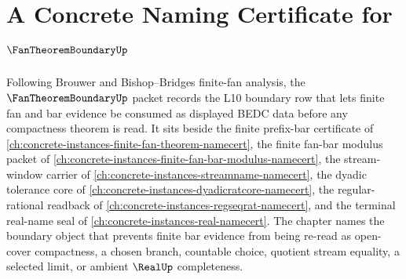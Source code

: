\chapter{A Concrete Naming Certificate for $\FanTheoremBoundaryUp$}
\label{ch:concrete-instances-fan-theorem-boundary-namecert}

Following Brouwer and Bishop--Bridges finite-fan analysis, the $\FanTheoremBoundaryUp$ packet records the L10 boundary row that lets finite fan and bar evidence be consumed as displayed BEDC data before any compactness theorem is read. It sits beside the finite prefix-bar certificate of \autoref{ch:concrete-instances-finite-fan-theorem-namecert}, the finite fan-bar modulus packet of \autoref{ch:concrete-instances-finite-fan-bar-modulus-namecert}, the stream-window carrier of \autoref{ch:concrete-instances-streamname-namecert}, the dyadic tolerance core of \autoref{ch:concrete-instances-dyadicratcore-namecert}, the regular-rational readback of \autoref{ch:concrete-instances-regseqrat-namecert}, and the terminal real-name seal of \autoref{ch:concrete-instances-real-namecert}. The chapter names the boundary object that prevents finite bar evidence from being re-read as open-cover compactness, a chosen branch, countable choice, quotient stream equality, a selected limit, or ambient $\RealUp$ completeness.

